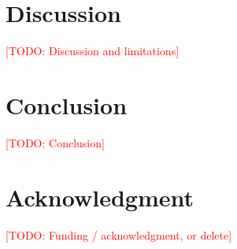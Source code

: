 \documentclass[conference]{IEEEtran}
\newcommand{\todo}[1]{\textcolor{red}{[TODO: #1]}}
\begin{document}
\section{Discussion}\label{sec:discussion}
\todo{Discussion and limitations}

\section{Conclusion}\label{sec:conclusion}
\todo{Conclusion}

\section*{Acknowledgment}
\todo{Funding / acknowledgment, or delete}



\end{document}
